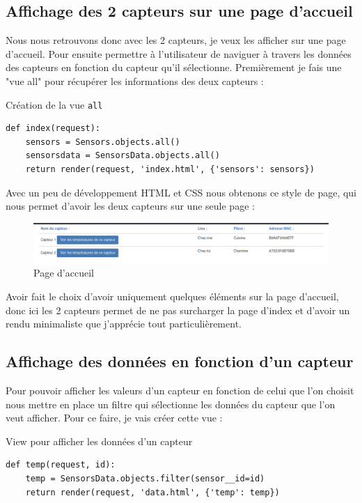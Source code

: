 \documentclass[12pt, a4paper]{article}
\begin{document}
	\subsection{Affichage des 2 capteurs sur une page d'accueil}
	Nous nous retrouvons donc avec les 2 capteurs, je veux les afficher sur une page d'accueil.
	Pour ensuite permettre à l'utilisateur de naviguer à travers les données des capteurs en 
	fonction du capteur qu'il sélectionne.
	Premièrement je fais une "vue all" pour récupérer les informations des deux capteurs :
	\begin{listing}[H]
		\caption{Création de la vue \texttt{all}}
		\label{lst:all}
		\begin{verbatim}
def index(request): 
    sensors = Sensors.objects.all()
    sensorsdata = SensorsData.objects.all()
    return render(request, 'index.html', {'sensors': sensors})
		\end{verbatim}
	\end{listing}
	\newpage
	Avec un peu de développement HTML et CSS nous obtenons ce style de page, qui nous permet d'avoir
	les deux capteurs sur une seule page :\\
	\begin{figure}[H]
		\centering
		\includegraphics[width=1\textwidth]{../img/index.png}
		\caption{Page d'accueil}
		\label{fig:index}
	\end{figure}
	Avoir fait le choix d'avoir uniquement quelques éléments sur la page d'accueil, donc ici
	les 2 capteurs permet de ne pas surcharger la page d'index et d'avoir un rendu minimaliste
	que j'apprécie tout particulièrement.\\

	\subsection{Affichage des données en fonction d'un capteur}
	Pour pouvoir afficher les valeurs d'un capteur en fonction de celui que l'on choisit nous 
	mettre en place un filtre qui sélectionne les données du capteur que l'on veut afficher.
	Pour ce faire, je vais créer cette vue :
	\begin{listing}[H]
		\caption{View pour afficher les données d'un capteur}
		\label{lst:sensor}
		\begin{verbatim}
def temp(request, id):
	temp = SensorsData.objects.filter(sensor__id=id)
	return render(request, 'data.html', {'temp': temp})
		\end{verbatim}
	\end{listing}
\end{document}
